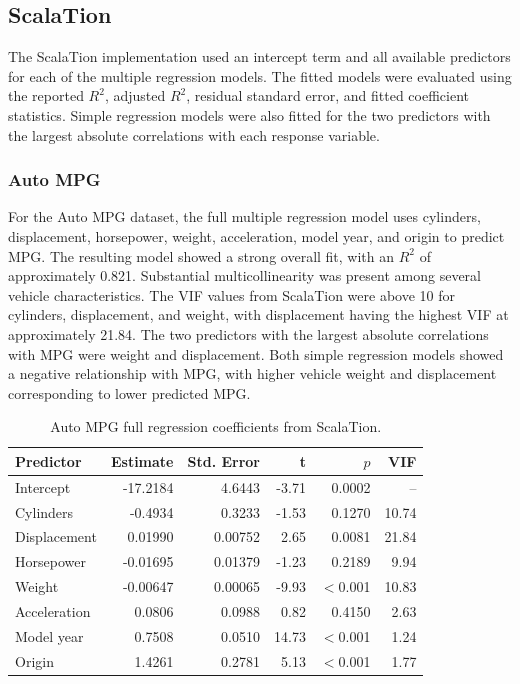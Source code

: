 \documentclass{article}
\begin{document}
\subsection{ScalaTion}

The ScalaTion implementation used an intercept term and all available predictors for each of the multiple regression models. The fitted models were evaluated using the reported $R^2$, adjusted $R^2$, residual standard error, and fitted coefficient statistics. Simple regression models were also fitted for the two predictors with the largest absolute correlations with each response variable.

\subsubsection{Auto MPG}

For the Auto MPG dataset, the full multiple regression model uses cylinders, displacement, horsepower, weight, acceleration, model year, and origin to predict MPG. The resulting model showed a strong overall fit, with an $R^2$ of approximately 0.821. Substantial multicollinearity was present among several vehicle characteristics. The VIF values from ScalaTion were above 10 for cylinders, displacement, and weight, with displacement having the highest VIF at approximately 21.84. The two predictors with the largest absolute correlations with MPG were weight and displacement. Both simple regression models showed a negative relationship with MPG, with higher vehicle weight and displacement corresponding to lower predicted MPG.

\begin{table}[H]
\centering
\small
\caption{Auto MPG full regression coefficients from ScalaTion.}
\label{tab:auto-scalation-coefficients}
\begin{tabular}{lrrrrr}
\hline
Predictor & Estimate & Std. Error & t & $p$ & VIF \\
\hline
Intercept    & -17.2184 & 4.6443  & -3.71  & 0.0002   & -- \\
Cylinders    & -0.4934  & 0.3233  & -1.53  & 0.1270   & 10.74 \\
Displacement & 0.01990  & 0.00752 & 2.65   & 0.0081   & 21.84 \\
Horsepower   & -0.01695 & 0.01379 & -1.23  & 0.2189   & 9.94 \\
Weight       & -0.00647 & 0.00065 & -9.93  & $<$0.001 & 10.83 \\
Acceleration & 0.0806   & 0.0988  & 0.82   & 0.4150   & 2.63 \\
Model year   & 0.7508   & 0.0510  & 14.73  & $<$0.001 & 1.24 \\
Origin       & 1.4261   & 0.2781  & 5.13   & $<$0.001 & 1.77 \\
\hline
\end{tabular}
\end{table}
\end{document}

